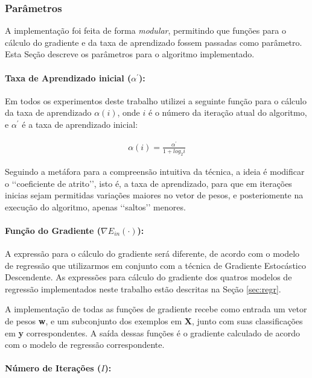 \documentclass[a4paper, 12pt]{article}
\begin{document}
\subsubsection{Parâmetros}

A implementação foi feita de forma \textit{modular}, permitindo que funções
para o cálculo do gradiente e da taxa de aprendizado fossem passadas como
parâmetro. Esta Seção descreve os parâmetros para o algoritmo implementado.

\paragraph{Taxa de Aprendizado inicial ($\alpha^{\prime}$):}

Em todos os experimentos deste trabalho utilizei a seguinte função
para o cálculo da taxa de aprendizado $\alpha(i)$, onde $i$ é o número da
iteração atual do algoritmo, e $\alpha^{\prime}$ é a taxa de aprendizado
inicial:

\begin{align*}
    \alpha(i) = \frac{\alpha^{\prime}}{1 + log_{2}i}
\end{align*}

Seguindo a metáfora para a compreensão intuitiva da técnica, a ideia é
modificar o \lq\lq{}coeficiente de atrito\rq\rq{}, isto é, a taxa de
aprendizado, para que em iterações inicias sejam permitidas variações maiores
no vetor de pesos, e posteriomente na execução do algoritmo, apenas
\lq\lq{}saltos\rq\rq{} menores.

\paragraph{Função do Gradiente ($\nabla{}E_{in}(\cdot)$):}

A expressão para o cálculo do gradiente será diferente, de acordo com o modelo
de regressão que utilizarmos em conjunto com a técnica de Gradiente Estocástico
Descendente. As expressões para cálculo do gradiente dos quatros modelos de
regressão implementados neste trabalho estão descritas na Seção \ref{sec:regr}.

A implementação de todas as funções de gradiente recebe como entrada um vetor
de pesos \textbf{w}, e um subconjunto dos exemplos em \textbf{X}, junto com
suas classificações em \textbf{y} correspondentes. A saída dessas funções é o
gradiente calculado de acordo com o modelo de regressão correspondente.

\paragraph{Número de Iterações ($I$):}
\end{document}
